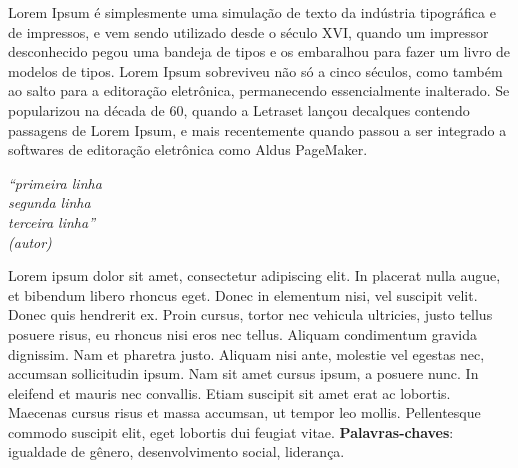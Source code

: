 \documentclass[
	12pt,				%
	a4paper,			%
    openany,
    oneside,
	english,			%
	french,				%
	spanish,			%
	brazil,				%
	]{abntex2}
\begin{document}

\frenchspacing 







\begin{agradecimentos}
Lorem Ipsum é simplesmente uma simulação de texto da indústria tipográfica e de impressos, e vem sendo utilizado desde o século XVI, quando um impressor desconhecido pegou uma bandeja de tipos e os embaralhou para fazer um livro de modelos de tipos. Lorem Ipsum sobreviveu não só a cinco séculos, como também ao salto para a editoração eletrônica, permanecendo essencialmente inalterado. Se popularizou na década de 60, quando a Letraset lançou decalques contendo passagens de Lorem Ipsum, e mais recentemente quando passou a ser integrado a softwares de editoração eletrônica como Aldus PageMaker.
\end{agradecimentos}

\begin{epigrafe}
    \vspace*{\fill}
	\begin{flushright}
		\textit{``primeira linha \\
		segunda linha \\
        terceira linha''\\
		(autor)}
	\end{flushright}
\end{epigrafe}
\setlength{\absparsep}{18pt} %
\begin{resumo}
Lorem ipsum dolor sit amet, consectetur adipiscing elit. In placerat nulla augue, et bibendum libero rhoncus eget. Donec in elementum nisi, vel suscipit velit. Donec quis hendrerit ex. Proin cursus, tortor nec vehicula ultricies, justo tellus posuere risus, eu rhoncus nisi eros nec tellus. Aliquam condimentum gravida dignissim. Nam et pharetra justo. Aliquam nisi ante, molestie vel egestas nec, accumsan sollicitudin ipsum. Nam sit amet cursus ipsum, a posuere nunc. In eleifend et mauris nec convallis. Etiam suscipit sit amet erat ac lobortis. Maecenas cursus risus et massa accumsan, ut tempor leo mollis. Pellentesque commodo suscipit elit, eget lobortis dui feugiat vitae.  \noindent
 \textbf{Palavras-chaves}: igualdade de gênero, desenvolvimento social, liderança.
\end{resumo}
\end{document}

